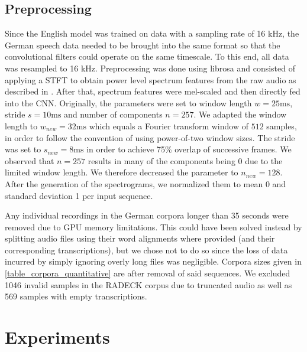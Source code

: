 \documentclass[11pt,a4paper]{article}
\begin{document}

\subsection{Preprocessing}

Since the English model was trained on data with a sampling rate of 16 kHz, the German speech data needed to be brought into the same format so that the convolutional filters could operate on the same timescale.
To this end, all data was resampled to 16 kHz.
Preprocessing was done using librosa \cite{mcfee_librosa_2015} and
consisted of applying a \ac{STFT} to obtain power level spectrum features from the raw audio as described in \citet{collobert_wav2letter_2016}.
After that, spectrum features were mel-scaled and then directly fed into the \ac{CNN}.
Originally, the parameters were set to window length $w = 25\mathrm{ms}$, stride $s = 10\mathrm{ms}$ and number of components $n = 257$.
We adapted the window length to $w_{new} = 32\mathrm{ms}$ which equals a Fourier transform window of $512$ samples, in order to follow the convention of using power-of-two window sizes.
The stride was set to $s_{new} = 8\mathrm{ms}$ in order to achieve 75\% overlap of successive frames.
We observed
that $n = 257$ results in many of the components being $0$ due to the limited window length.
We therefore decreased the parameter to $n_{new} = 128$.
After the generation of the spectrograms, we normalized them to mean 0 and standard deviation 1 per input sequence.

Any individual recordings in the German corpora longer than 35 seconds were removed due to GPU memory limitations. 
This could have been solved instead by splitting audio files using their word alignments where provided (and their corresponding transcriptions), but we chose not to do so since the loss of data incurred by simply ignoring overly long files was negligible.
Corpora sizes given in \autoref{table_corpora_quantitative} are after removal of said sequences.
We excluded 1046 invalid samples in the RADECK corpus due to truncated audio as well as 569 samples with empty transcriptions.


\section{Experiments}\label{sec:experiments}
\end{document}
